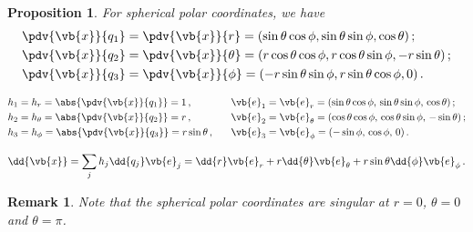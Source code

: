 \documentclass{article}
\theoremstyle{plain}\theoremheaderfont{\normalfont\itshape}\theorembodyfont{\rmfamily}\theoremseparator{.}\newtheorem*{rem}{Remark}\newtheorem*{ex}{Example}\newtheorem*{proof}{Proof}\newtheorem*{altp}{Alternative proof}
\theoremstyle{plain}\theoremheaderfont{\normalfont\bfseries}\theorembodyfont{\rmfamily}\theoremseparator{.}\newtheorem{thm}{Theorem}[section]\newtheorem{lem}[thm]{Lemma}\newtheorem{prop}[thm]{Proposition}\newtheorem*{cor}{Corollary}\newtheorem{defn}[thm]{Definition}\newtheorem{clm}[thm]{Claim}\newtheorem{clminproof}{Claim}
\theoremstyle{break}\theoremheaderfont{\normalfont\itshape}\theorembodyfont{\rmfamily}\theoremseparator{.\medskip}\newtheorem*{proofskip}{Proof}\newtheorem*{exs}{Examples}\newtheorem*{rems}{Remarks}
\theoremstyle{break}\theoremheaderfont{\normalfont\bfseries}\theorembodyfont{\rmfamily}\theoremseparator{.\medskip}\newtheorem{lemskip}[thm]{Lemma}\newtheorem{defnskip}[thm]{Definition}\newtheorem{propskip}[thm]{Proposition}\newtheorem{thmskip}[thm]{Theorem}
\numberwithin{equation}{section}
\begin{document}
	\begin{prop}
		For spherical polar coordinates, we have
		\begin{align*}
			&\pdv{\vb{x}}{q_1}=\pdv{\vb{x}}{r}=(\sin\theta\cos\phi,\sin\theta\sin\phi,\cos\theta)\,;\\
			&\pdv{\vb{x}}{q_2}=\pdv{\vb{x}}{\theta}=(r\cos\theta\cos\phi,r\cos\theta \sin\phi,-r\sin\theta)\,;\\
			&\pdv{\vb{x}}{q_3}=\pdv{\vb{x}}{\phi}=(-r\sin\theta\sin\phi,r\sin\theta\cos\phi,0)\,.
		\end{align*}
		
		\begin{align*}
			&h_1=h_r=\abs{\pdv{\vb{x}}{q_1}}=1\,,\qquad\quad &\vb{e}_1&=\vb{e}_r=(\sin\theta\cos\phi,\, \sin\theta\sin\phi,\, \cos\theta)\,;\\
			&h_2=h_\theta=\abs{\pdv{\vb{x}}{q_2}}=r\,, &\vb{e}_2&=\vb{e}_\theta=(\cos\theta\cos\phi,\, \cos\theta\sin\phi,\, -\sin\theta)\,;\\
			&h_3=h_\phi=\abs{\pdv{\vb{x}}{q_3}}=r\sin\theta\,, &\vb{e}_3&=\vb{e}_\phi=(-\sin\phi,\, \cos\phi,\, 0)\,.
		\end{align*}
		
		\[\dd{\vb{x}}=\sum_j h_j\dd{q_j}\vb{e}_j=\dd{r}\vb{e}_r+r\dd{\theta}\vb{e}_\theta+r\sin\theta\dd{\phi}\vb{e}_\phi\,.\]
	\end{prop}
	\begin{rem}
		Note that the spherical polar coordinates are singular at \(r=0\), \(\theta=0\) and \(\theta=\pi\).
	\end{rem}
	
\end{document}
